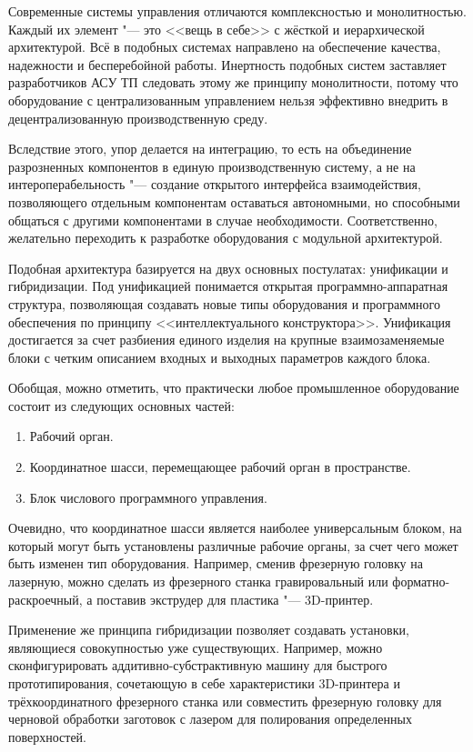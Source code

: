 Современные системы управления отличаются комплексностью и монолитностью. Каждый их элемент "--- это <<вещь в себе>> с жёсткой и иерархической архитектурой. Всё в подобных системах направлено на обеспечение качества, надежности и бесперебойной работы. Инертность подобных систем заставляет разработчиков АСУ ТП следовать этому же принципу монолитности, потому что оборудование с централизованным управлением нельзя эффективно внедрить в децентрализованную производственную среду.

Вследствие этого, упор делается на интеграцию, то есть на объединение разрозненных компонентов в единую производственную систему, а не на интероперабельность "--- создание открытого интерфейса взаимодействия, позволяющего отдельным компонентам оставаться автономными, но способными общаться с другими компонентами в случае необходимости. Соответственно, желательно переходить к разработке оборудования с модульной архитектурой.

Подобная архитектура базируется на двух основных постулатах: унификации и гибридизации. Под унификацией понимается открытая программно-аппаратная структура, позволяющая создавать новые типы оборудования и программного обеспечения по принципу <<интеллектуального конструктора>>. Унификация достигается за счет разбиения единого изделия на крупные взаимозаменяемые блоки с четким описанием входных и выходных параметров каждого блока.

Обобщая, можно отметить, что практически любое промышленное оборудование состоит из следующих основных частей:

\begin{enumerate}
	\item Рабочий орган.
	\item Координатное шасси, перемещающее рабочий орган в пространстве.
	\item Блок числового программного управления.
\end{enumerate}

Очевидно, что координатное шасси является наиболее универсальным блоком, на который могут быть установлены различные рабочие органы, за счет чего может быть изменен тип оборудования. Например, сменив фрезерную головку на лазерную, можно сделать из фрезерного станка гравировальный или форматно-раскроечный, а поставив экструдер для пластика "--- 3D-принтер.

Применение же принципа гибридизации позволяет создавать установки, являющиеся совокупностью уже существующих. Например, можно сконфигурировать аддитивно-субстрактивную машину для быстрого прототипирования, сочетающую в себе характеристики 3D-принтера и трёхкоординатного фрезерного станка или совместить фрезерную головку для черновой обработки заготовок с лазером для полирования определенных поверхностей.

